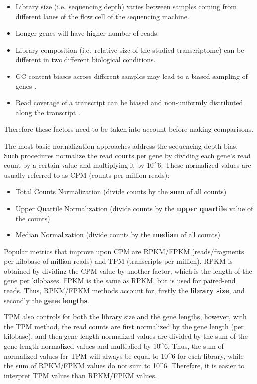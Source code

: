\documentclass[12pt,]{krantz}
\providecommand{\tightlist}{%
  \setlength{\itemsep}{0pt}\setlength{\parskip}{0pt}}
\begin{document}
\begin{itemize}
\tightlist
\item
  Library size (i.e.~sequencing depth) varies between samples coming from different lanes of the flow cell of the sequencing machine.
\item
  Longer genes will have higher number of reads.\\
\item
  Library composition (i.e.~relative size of the studied transcriptome) can be different in two different biological conditions.
\item
  GC content biases across different samples may lead to a biased sampling of genes \citep{risso_gc-content_2011}.
\item
  Read coverage of a transcript can be biased and non-uniformly distributed along the transcript \citep{mortazavi_mapping_2008}.
\end{itemize}

Therefore these factors need to be taken into account before making comparisons.

The most basic normalization approaches address the sequencing depth bias. Such procedures normalize the read counts per gene by dividing each gene's read count by a certain value and multiplying it by 10\^{}6. These normalized values are usually referred to as CPM (counts per million reads):

\begin{itemize}
\tightlist
\item
  Total Counts Normalization (divide counts by the \textbf{sum} of all counts)
\item
  Upper Quartile Normalization (divide counts by the \textbf{upper quartile} value of the counts)
\item
  Median Normalization (divide counts by the \textbf{median} of all counts)
\end{itemize}

Popular metrics that improve upon CPM are RPKM/FPKM (reads/fragments per kilobase of million reads) and TPM (transcripts per million). RPKM is obtained by dividing the CPM value by another factor, which is the length of the gene per kilobases. FPKM is the same as RPKM, but is used for paired-end reads. Thus, RPKM/FPKM methods account for, firstly the \textbf{library size}, and secondly the \textbf{gene lengths}.

TPM also controls for both the library size and the gene lengths, however, with the TPM method, the read counts are first normalized by the gene length (per kilobase), and then gene-length normalized values are divided by the sum of the gene-length normalized values and multiplied by 10\^{}6. Thus, the sum of normalized values for TPM will always be equal to 10\^{}6 for each library, while the sum of RPKM/FPKM values do not sum to 10\^{}6. Therefore, it is easier to interpret TPM values than RPKM/FPKM values.
\end{document}
